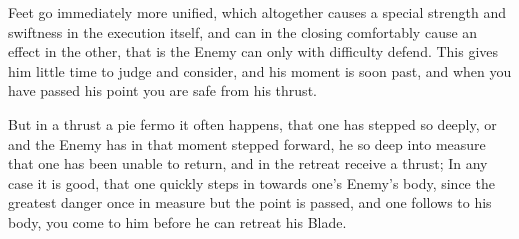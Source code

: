 \newpage


\newpage


Feet go immediately more unified, which altogether causes a special
strength and swiftness in the execution itself, and can in the closing
comfortably cause an effect in the other, that is the Enemy can only
with difficulty defend. This gives him little time to judge and
consider, and his moment is soon past, and when you have passed his
point you are safe from his thrust.


But in a thrust a pie fermo it often happens, that one has stepped so
deeply, or and the Enemy has in that moment stepped forward, he so
deep into measure that one has been unable to return, and in the
retreat receive a thrust; In any case it is good, that one quickly
steps in towards one's Enemy's body, since the greatest danger once in
measure but the point is passed, and one follows to his body, you come
to him before he can retreat his Blade.


